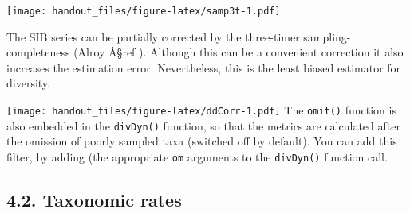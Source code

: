 \documentclass[]{article}
\newenvironment{Shaded}{\begin{snugshade}}{\end{snugshade}}
\newcommand{\KeywordTok}[1]{\textcolor[rgb]{0.13,0.29,0.53}{\textbf{{#1}}}}
\newcommand{\DataTypeTok}[1]{\textcolor[rgb]{0.13,0.29,0.53}{{#1}}}
\newcommand{\DecValTok}[1]{\textcolor[rgb]{0.00,0.00,0.81}{{#1}}}
\newcommand{\StringTok}[1]{\textcolor[rgb]{0.31,0.60,0.02}{{#1}}}
\newcommand{\CommentTok}[1]{\textcolor[rgb]{0.56,0.35,0.01}{\textit{{#1}}}}
\newcommand{\NormalTok}[1]{{#1}}
\begin{document}
\texttt{[image: handout\_files/figure-latex/samp3t-1.pdf]}

The SIB series can be partially corrected by the three-timer
sampling-completeness (Alroy Â§ref ). Although this can be a convenient
correction it also increases the estimation error. Nevertheless, this is
the least biased estimator for diversity.

\begin{Shaded}
\end{Shaded}

\texttt{[image: handout\_files/figure-latex/ddCorr-1.pdf]} The
\texttt{omit()} function is also embedded in the \texttt{divDyn()}
function, so that the metrics are calculated after the omission of
poorly sampled taxa (switched off by default). You can add this filter,
by adding (the appropriate \texttt{om} arguments to the
\texttt{divDyn()} function call.

\subsection{4.2. Taxonomic rates}\label{taxonomic-rates}
\end{document}
